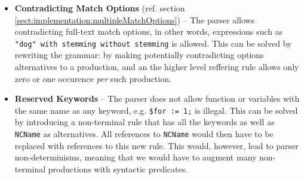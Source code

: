 \begin{itemize}
\item \textbf{Contradicting Match Options} (ref. section \ref{sect:implementation:multipleMatchOptions}) -- The parser allows contradicting full-text match options, in other words, expressions such as \verb!"dog" with stemming without stemming! is allowed. This can be solved by rewriting the grammar: by making potentially contradicting options alternatives to a production, and an the higher level reffering rule allows only zero or one occurence \emph{per} such production.

\item \textbf{Reserved Keywords} -- The parser does not allow function or variables with the same name as any keyword, e.g. \verb!$for := 1;! is illegal. This can be solved by introducing a non-terminal rule that has all the keywords as well as \verb!NCName! as alternatives. All references to \verb!NCName! would then have to be replaced with references to this new rule. This would, however, lead to parser non-determinisms, meaning that we would have to augment many non-terminal productions with syntactic predicates.

\end{itemize}

